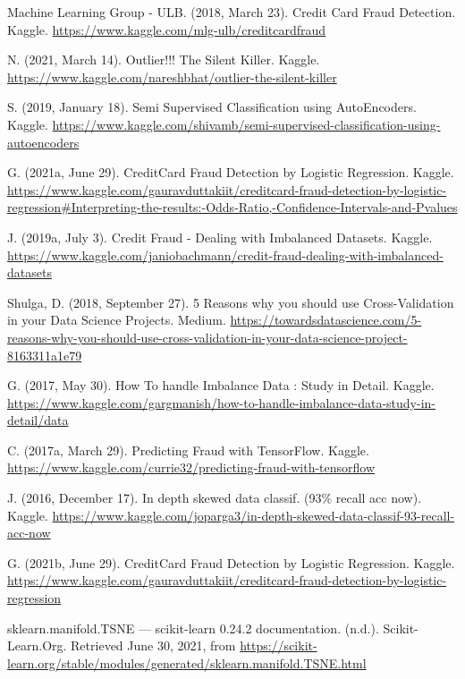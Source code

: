 \documentclass[conference]{IEEEtran}
\begin{document}
\begin{thebibliography}{00}

 Machine Learning Group - ULB. (2018, March 23). Credit Card Fraud Detection. Kaggle. \url{https://www.kaggle.com/mlg-ulb/creditcardfraud}

 N. (2021, March 14). Outlier!!! The Silent Killer. Kaggle. \url{https://www.kaggle.com/nareshbhat/outlier-the-silent-killer}

 S. (2019, January 18). Semi Supervised Classification using AutoEncoders. Kaggle. \url{https://www.kaggle.com/shivamb/semi-supervised-classification-using-autoencoders}

 G. (2021a, June 29). CreditCard Fraud Detection by Logistic Regression. Kaggle. \url{https://www.kaggle.com/gauravduttakiit/creditcard-fraud-detection-by-logistic-regression\#Interpreting-the-results:-Odds-Ratio,-Confidence-Intervals-and-Pvalues}

 J. (2019a, July 3). Credit Fraud - Dealing with Imbalanced Datasets. Kaggle. \url{https://www.kaggle.com/janiobachmann/credit-fraud-dealing-with-imbalanced-datasets}

 Shulga, D. (2018, September 27). 5 Reasons why you should use Cross-Validation in your Data Science Projects. Medium. \url{https://towardsdatascience.com/5-reasons-why-you-should-use-cross-validation-in-your-data-science-project-8163311a1e79}

 G. (2017, May 30). How To handle Imbalance Data : Study in Detail. Kaggle. \url{https://www.kaggle.com/gargmanish/how-to-handle-imbalance-data-study-in-detail/data}

 C. (2017a, March 29). Predicting Fraud with TensorFlow. Kaggle. \url{https://www.kaggle.com/currie32/predicting-fraud-with-tensorflow}

 J. (2016, December 17). In depth skewed data classif. (93\% recall acc now). Kaggle. \url{https://www.kaggle.com/joparga3/in-depth-skewed-data-classif-93-recall-acc-now}

 G. (2021b, June 29). CreditCard Fraud Detection by Logistic Regression. Kaggle. \url{https://www.kaggle.com/gauravduttakiit/creditcard-fraud-detection-by-logistic-regression}

 sklearn.manifold.TSNE — scikit-learn 0.24.2 documentation. (n.d.). Scikit-Learn.Org. Retrieved June 30, 2021, from \url{https://scikit-learn.org/stable/modules/generated/sklearn.manifold.TSNE.html}


\end{thebibliography}
\end{document}
